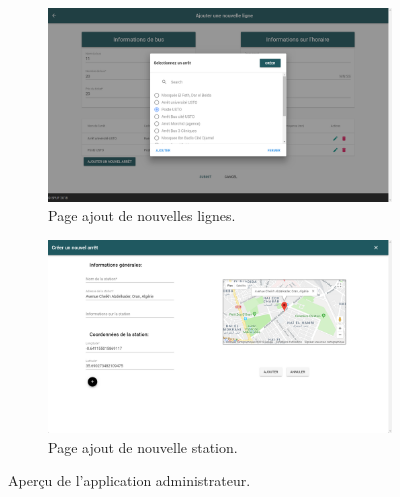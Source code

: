 \begin{figure}[h!]
	 \begin{subfigure}[b]{\linewidth}
	 	\includegraphics[width=\linewidth]{img/spuf/stationadd.png}
	 	\caption{Page ajout de nouvelles lignes.}	 
	 \end{subfigure}
	 
	 \begin{subfigure}[b]{\linewidth}
	 	\includegraphics[width=\linewidth]{img/spuf/createstation.png}
	 	\caption{Page ajout de nouvelle station.}	 
	 \end{subfigure}
	 \caption{Aperçu de l'application administrateur.}
	 \label{fig:adminInterface2}
\end{figure}